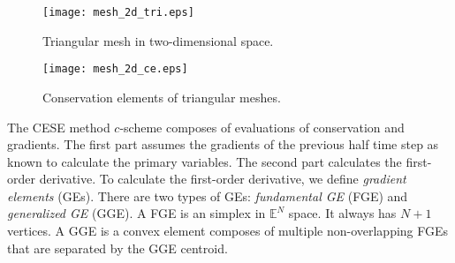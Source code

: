 \documentclass[11pt,dvips]{article}
\numberwithin{equation}{section}
\begin{document}
%
\begin{figure}[h]
\centering
\texttt{[image: mesh\_2d\_tri.eps]}
\caption{Triangular mesh in two-dimensional space.}
\label{f:mesh_2d_tri}
\end{figure}

\begin{figure}[h]
\centering
\texttt{[image: mesh\_2d\_ce.eps]}
\caption{Conservation elements of triangular meshes.}
\label{f:mesh_2d_ce}
\end{figure}
%

\clearpage

The CESE method $c$-scheme composes of evaluations of conservation and
gradients.  The first part assumes the gradients of the previous half time step
as known to calculate the primary variables.  The second part calculates the
first-order derivative.  To calculate the first-order derivative, we define
\textit{gradient elements} (GEs)\cite{chen_multi-physics_2011}.  There are two
types of GEs: \textit{fundamental GE} (FGE) and \textit{generalized GE} (GGE).
A FGE is an simplex in $\mathbb{E}^N$ space.  It always has $N+1$ vertices.  A
GGE is a convex element composes of multiple non-overlapping FGEs that are
separated by the GGE centroid.
\end{document}
